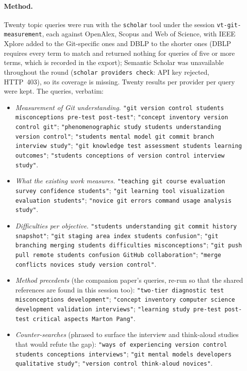 \paragraph{Method.}
Twenty topic queries were run with the \texttt{scholar} tool under the
session \texttt{vt-git-measurement}, each against OpenAlex, Scopus and
Web of Science, with IEEE Xplore added to the Git-specific ones and DBLP
to the shorter ones (DBLP requires every term to match and returned
nothing for queries of five or more terms, which is recorded in the
export); Semantic Scholar was unavailable throughout the round
(\texttt{scholar providers check}: API key rejected, HTTP~403), so its
coverage is missing.
Twenty results per provider per query were kept.
The queries, verbatim:
\begin{itemize}
  \item \emph{Measurement of Git understanding.}
    \texttt{"git version control students misconceptions pre-test
    post-test"};
    \texttt{"concept inventory version control git"};
    \texttt{"phenomenographic study students understanding version
    control"};
    \texttt{"students mental model git commit branch interview study"};
    \texttt{"git knowledge test assessment students learning outcomes"};
    \texttt{"students conceptions of version control interview study"}.
  \item \emph{What the existing work measures.}
    \texttt{"teaching git course evaluation survey confidence students"};
    \texttt{"git learning tool visualization evaluation students"};
    \texttt{"novice git errors command usage analysis study"}.
  \item \emph{Difficulties per objective.}
    \texttt{"students understanding git commit history snapshot"};
    \texttt{"git staging area index students confusion"};
    \texttt{"git branching merging students difficulties
    misconceptions"};
    \texttt{"git push pull remote students confusion GitHub
    collaboration"};
    \texttt{"merge conflicts novices study version control"}.
  \item \emph{Method precedents} (the companion paper's queries, re-run so
    that the shared references are found in this session too):
    \texttt{"two-tier diagnostic test misconceptions development"};
    \texttt{"concept inventory computer science development validation
    interviews"};
    \texttt{"learning study pre-test post-test critical aspects Marton
    Pang"}.
  \item \emph{Counter-searches} (phrased to surface the interview and
    think-aloud studies that would refute the gap):
    \texttt{"ways of experiencing version control students conceptions
    interviews"};
    \texttt{"git mental models developers qualitative study"};
    \texttt{"version control think-aloud novices"}.
\end{itemize}
